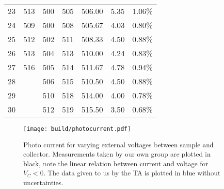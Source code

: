 \begin{table*}
\begin{tabular}{c c c c c c c}
    23&513   &500&505&506.00&5.35&1.06\% \\
    24&509   &500&508&505.67&4.03&0.80\% \\
    25&512   &502&511&508.33&4.50&0.88\% \\
    26&513   &504&513&510.00&4.24&0.83\% \\
    27&516   &505&514&511.67&4.78&0.94\% \\
    28&&506&515&510.50&4.50&0.88\% \\
    29&&510&518&514.00&4.00&0.78\% \\
    30&&512&519&515.50&3.50&0.68\% \\
  \end{tabular}
\end{table*}


\begin{figure*}
  \centering
  \texttt{[image: build/photocurrent.pdf]}
  \caption{Photo current for varying external voltages between sample and collector. Measurements taken by 
  our own group are plotted in black, note the linear relation between current and voltage for
  $V_C<0$. The data given to us by the TA is plotted in blue without uncertainties.}
  \label{fig:photocurrent}
\end{figure*}
